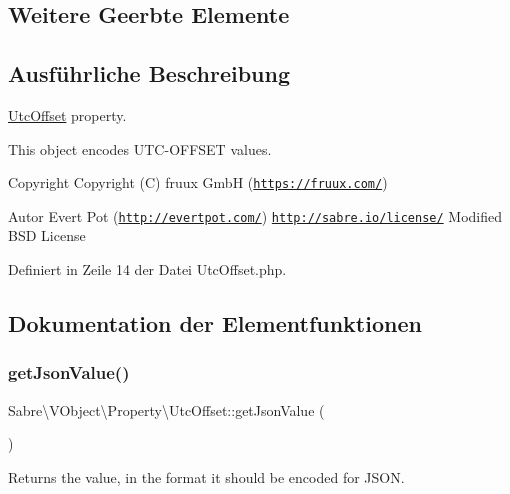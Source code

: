 \subsection*{Weitere Geerbte Elemente}


\subsection{Ausführliche Beschreibung}
\mbox{\hyperlink{class_sabre_1_1_v_object_1_1_property_1_1_utc_offset}{Utc\+Offset}} property.

This object encodes U\+T\+C-\/\+O\+F\+F\+S\+ET values.

\begin{DoxyCopyright}{Copyright}
Copyright (C) fruux GmbH (\href{https://fruux.com/}{\tt https\+://fruux.\+com/}) 
\end{DoxyCopyright}
\begin{DoxyAuthor}{Autor}
Evert Pot (\href{http://evertpot.com/}{\tt http\+://evertpot.\+com/})  \href{http://sabre.io/license/}{\tt http\+://sabre.\+io/license/} Modified B\+SD License 
\end{DoxyAuthor}


Definiert in Zeile 14 der Datei Utc\+Offset.\+php.



\subsection{Dokumentation der Elementfunktionen}
\mbox{\label{class_sabre_1_1_v_object_1_1_property_1_1_utc_offset_a2790c9c50e69f36bf9701b8fd8397c3b}} 
\subsubsection{\texorpdfstring{get\+Json\+Value()}{getJsonValue()}}
{\footnotesize\ttfamily Sabre\textbackslash{}\+V\+Object\textbackslash{}\+Property\textbackslash{}\+Utc\+Offset\+::get\+Json\+Value (\begin{DoxyParamCaption}{ }\end{DoxyParamCaption})}

Returns the value, in the format it should be encoded for J\+S\+ON.

